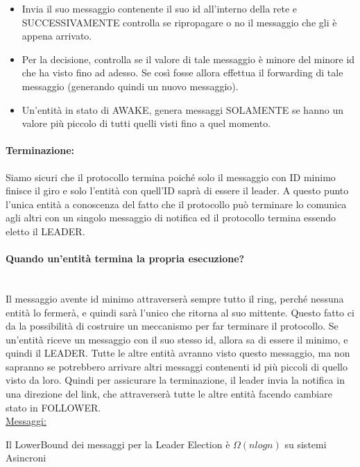 \begin{itemize}
    \item Invia il suo messaggio contenente il suo id all'interno della rete e
          SUCCESSIVAMENTE controlla se ripropagare o no il messaggio che gli è appena
          arrivato.
    \item Per la decisione, controlla se  il valore di tale messaggio è minore del
          minore id che ha visto fino ad adesso. Se così fosse allora effettua il
          forwarding di tale messaggio (generando quindi un nuovo messaggio).
    \item Un'entità in stato di AWAKE, genera messaggi SOLAMENTE se hanno un
          valore più piccolo di tutti quelli visti fino a quel momento.
\end{itemize}

\paragraph{Terminazione:} Siamo sicuri che il protocollo termina poiché solo il
messaggio con ID minimo finisce il giro e solo l'entità con quell'ID saprà di
essere il leader. A questo punto l'unica entità a conoscenza del fatto che il
protocollo può terminare lo comunica agli altri con un singolo messaggio di
notifica ed il protocollo termina essendo eletto il LEADER.

\paragraph{Quando un'entità termina la propria esecuzione?}\ \\
Il messaggio avente id minimo attraverserà sempre tutto il ring, perché nessuna
entità lo fermerà, e quindi sarà l'unico che ritorna al suo mittente. Questo
fatto ci da la possibilità di costruire un meccanismo per far terminare il
protocollo. Se un'entità riceve un messaggio con il suo stesso id, allora sa di
essere il minimo, e quindi il LEADER. Tutte le altre entità avranno visto questo
messaggio, ma non sapranno se potrebbero arrivare altri messaggi contenenti id
più piccoli di quello visto da loro. Quindi per assicurare la terminazione, il
leader invia la notifica in una direzione del link, che attraverserà tutte le
altre entità facendo cambiare stato in FOLLOWER.\\
\underline{Messaggi:}

\begin{center}
    Il LowerBound dei messaggi per la Leader Election è $\Omega(nlogn)$ su sistemi
    Asincroni
\end{center}{}

